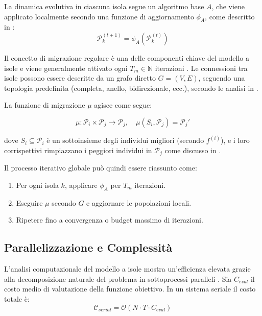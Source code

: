 \documentclass{article}
\begin{document}
La dinamica evolutiva in ciascuna isola segue un algoritmo base $A$, che viene applicato localmente 
secondo una funzione di aggiornamento $\phi_A$, come descritto in \cite{kennedy1995particle, engelbrecht2007computational}:
\begin{equation}
\mathcal{P}_k^{(t+1)} = \phi_A(\mathcal{P}_k^{(t)})
\end{equation}

Il concetto di migrazione regolare è una delle componenti chiave del modello a isole e viene 
generalmente attivato ogni $T_m \in \mathbb{N}$ iterazioni \cite{tomassini2005spatially}. 
Le connessioni tra isole possono essere descritte da un grafo diretto $G = (V, E)$, seguendo una 
topologia predefinita (completa, anello, bidirezionale, ecc.), secondo le analisi in \cite{cantupaz1998survey}.

La funzione di migrazione $\mu$ agisce come segue:

\begin{equation}
\mu: \mathcal{P}_i \times \mathcal{P}_j \rightarrow \mathcal{P}_j, \quad \mu(S_i, \mathcal{P}_j) = \mathcal{P}_j'
\end{equation}

dove $S_i \subseteq \mathcal{P}_i$ è un sottoinsieme degli individui migliori (secondo $f^{(i)}$), e i loro 
corrispettivi rimpiazzano i peggiori individui in $\mathcal{P}_j$ come discusso in \cite{alba2002parallelism}.

Il processo iterativo globale può quindi essere riassunto come:

\begin{enumerate}
    \item Per ogni isola $k$, applicare $\phi_A$ per $T_m$ iterazioni.
    \item Eseguire $\mu$ secondo $G$ e aggiornare le popolazioni locali.
    \item Ripetere fino a convergenza o budget massimo di iterazioni.
\end{enumerate}

\subsection{Parallelizzazione e Complessità}

L'analisi computazionale del modello a isole mostra un'efficienza elevata grazie alla decomposizione 
naturale del problema in sottoprocessi paralleli \cite{alba2005parallel}. Sia $C_{eval}$ il costo medio 
di valutazione della funzione obiettivo. In un sistema seriale il costo totale è:
\begin{equation}
\mathcal{C}_{serial} = \mathcal{O}(N \cdot T \cdot C_{eval})
\end{equation}
\end{document}
